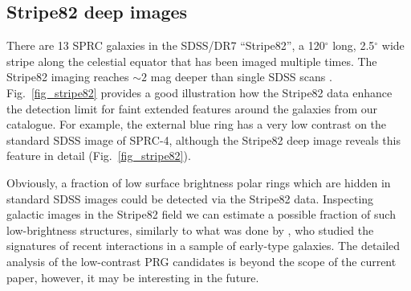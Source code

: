 \documentclass[useAMS,usenatbib]{mn2e}
\begin{document}
\subsection{Stripe82 deep images}
\label{sect_stripe82}


There are  13 SPRC galaxies in the  SDSS/DR7 ``Stripe82'', a 120$^\circ$ long, 2.5$^\circ$ wide stripe along
the celestial equator that has been imaged multiple times. The Stripe82 imaging reaches $\sim2$ mag deeper
than single SDSS scans \citep{sdss7}.
Fig.~\ref{fig_stripe82} provides a good illustration how the Stripe82 data enhance the detection limit for faint extended features around the galaxies from our catalogue. For example, the external blue ring has a very low contrast on the standard SDSS image of   SPRC-4, although the Stripe82 deep image reveals  this feature in detail (Fig.~\ref{fig_stripe82}).

Obviously,  a  fraction  of low surface brightness polar rings which are hidden  in standard SDSS images could be detected via  the Stripe82 data. Inspecting  galactic images in the Stripe82 field we can estimate a possible fraction of such low-brightness structures, similarly to what was done by \citet{Kaviraj2010}, who studied the signatures of recent interactions in a sample of early-type galaxies. The detailed analysis of the low-contrast PRG candidates is beyond the scope of the current paper, however, it may be interesting in the future.
\end{document}

